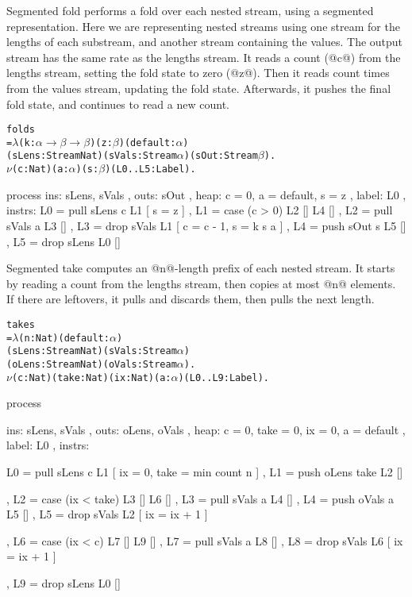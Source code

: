 \newpage

Segmented fold performs a fold over each nested stream, using a segmented representation.
Here we are representing nested streams using one stream for the lengths of each substream, and another stream containing the values.
The output stream has the same rate as the lengths stream.
It reads a count (@c@) from the lengths stream, setting the fold state to zero (@z@).
Then it reads count times from the values stream, updating the fold state.
Afterwards, it pushes the final fold state, and continues to read a new count.

\begin{alltt}
    folds 
        = \(\lambda\) (k : \(\alpha \to \beta \to \beta\)) (z : \(\beta\)) (default : \(\alpha\))
            (sLens: Stream Nat) (sVals: Stream \(\alpha\)) (sOut: Stream \(\beta\)).
          \(\nu\) (c : Nat) (a: \(\alpha\)) (s : \(\beta\)) (L0..L5: Label).
\end{alltt}
\begin{code}
         process
         { ins:    { sLens, sVals }
         , outs:   { sOut }
         , heap:   { c = 0, a = default, s = z }
         , label:  L0
         , instrs: { L0 = pull sLens c      L1 [ s = z ]
                   , L1 = case (c > 0)      L2 []  L4 []
                   , L2 = pull sVals a      L3 []
                   , L3 = drop sVals        L1 [ c = c - 1, s = k s a ]
                   , L4 = push sOut  s      L5 []
                   , L5 = drop sLens        L0 [] } }
\end{code}

Segmented take computes an @n@-length prefix of each nested stream.
It starts by reading a count from the lengths stream, then copies at most @n@ elements.
If there are leftovers, it pulls and discards them, then pulls the next length.

\begin{alltt}
    takes 
        = \(\lambda\) (n : Nat) (default : \(\alpha\))
            (sLens: Stream Nat) (sVals: Stream \(\alpha\))
            (oLens: Stream Nat) (oVals: Stream \(\alpha\)).
          \(\nu\) (c : Nat) (take : Nat) (ix : Nat) (a: \(\alpha\)) (L0..L9: Label).
\end{alltt}
\begin{code}
         process
         { ins:    { sLens, sVals }
         , outs:   { oLens, oVals }
         , heap:   { c = 0, take = 0, ix = 0, a = default }
         , label:  L0
         , instrs: { L0 = pull sLens c      L1 [ ix = 0, take = min count n ]
                   , L1 = push oLens take   L2 []

                   , L2 = case (ix < take)  L3 []  L6 []
                   , L3 = pull sVals a      L4 []
                   , L4 = push oVals a      L5 []
                   , L5 = drop sVals        L2 [ ix = ix + 1 ]

                   , L6 = case (ix < c)     L7 []  L9 []
                   , L7 = pull sVals a      L8 []
                   , L8 = drop sVals        L6 [ ix = ix + 1 ]

                   , L9 = drop sLens        L0 [] } }
\end{code}

